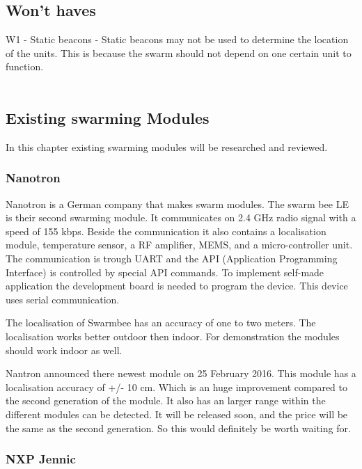 \documentclass[10pt,a4paper]{article}
\begin{document}
\subsection{Won't haves}

W1 - Static beacons - Static beacons may not be used to determine the location of the units. This is because the swarm should not depend on one certain unit to function.\\\\



\newpage



\newpage
\subsection{Existing swarming Modules}

In this chapter existing swarming modules will be researched and reviewed.

\subsubsection{Nanotron}

Nanotron is a German company that makes swarm modules. The swarm bee LE is their second swarming module. It communicates on 2.4 GHz radio signal with a speed of 155 kbps. Beside the communication it also contains a localisation module, temperature sensor, a RF amplifier, MEMS, and a micro-controller unit. The communication is trough UART and the API (Application Programming Interface) is controlled by special API commands. To implement self-made application the development board is needed to program the device. This device uses serial communication. 

The localisation of Swarmbee has an accuracy of one to two meters. The localisation works better outdoor then indoor. For demonstration the modules should work indoor as well. \cite{etotaal}

Nantron announced there newest module on 25 February 2016. This module has a localisation accuracy of +/- 10 cm. Which is an huge improvement compared to the second generation of the module. It also has an larger range within the different modules can be detected. It will be released soon, and the price will be the same as the second generation. So this would definitely be worth waiting for. \cite{nanotron}
	
\subsubsection{NXP Jennic} 
\end{document}
